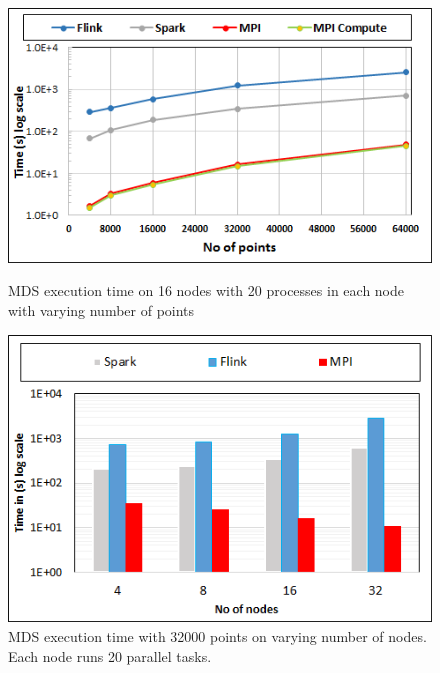 \documentclass[conference]{IEEEtran}
\begin{document}
\begin{figure}[!htb]
    \centering
\begin{minipage}{.49\textwidth}
    \centering
    \includegraphics[width=0.95\columnwidth]{images/mds-points.png}
    \caption{MDS execution time on 16 nodes with 20 processes in each node with varying number of points}
    \label{fig:fig_mds_points}
\end{minipage}
\hspace{1.4mm}
\begin{minipage}{.49\textwidth}
    \centering
    \includegraphics[width=0.95\columnwidth]{images/mds-nodes.png}
    \caption{MDS execution time with 32000 points on varying number of nodes. Each node runs 20 parallel tasks.}
    \label{fig:fig_mds_nodes}
\end{minipage}
\end{figure}
\end{document}
